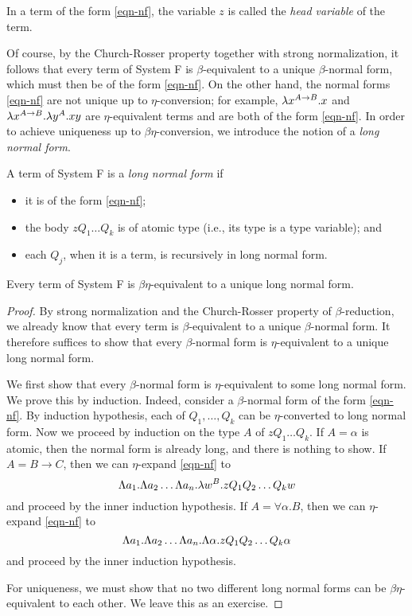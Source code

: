\documentclass{article}
\begin{document}
\begin{definition}
  In a term of the form {\eqref{eqn-nf}}, the variable $z$ is called
  the {\em head variable} of the term.
\end{definition}

Of course, by the Church-Rosser property together with strong
normalization, it follows that every term of System F is
$\beta$-equivalent to a unique $\beta$-normal form, which must then be
of the form {\eqref{eqn-nf}}. On the other hand, the normal forms
{\eqref{eqn-nf}} are not unique up to $\eta$-conversion; for example,
$\lambda x^{A\to B}.x$ and $\lambda x^{A\to B}.\lambda y^{A}.xy$ are
$\eta$-equivalent terms and are both of the form {\eqref{eqn-nf}}. 
In order to achieve uniqueness up to $\beta\eta$-conversion, we
introduce the notion of a {\em long normal form}.

\begin{definition}
  A term of System F is a {\em long normal form} if
  \begin{itemize}
  \item it is of the form {\eqref{eqn-nf}};
  \item the body $zQ_1\ldots Q_k$ is of atomic type (i.e., its type is
    a type variable); and
  \item each $Q_j$, when it is a term, is recursively in long normal form.
  \end{itemize}
\end{definition}

\begin{proposition}\label{prop-unique-lnf}
  Every term of System F is $\beta\eta$-equivalent to a unique long
  normal form.
\end{proposition}

\begin{proof}
  By strong normalization and the Church-Rosser property of
  $\beta$-reduction, we already know that every term is
  $\beta$-equivalent to a unique $\beta$-normal form. It therefore
  suffices to show that every $\beta$-normal form is $\eta$-equivalent
  to a unique long normal form.

  We first show that every $\beta$-normal form is $\eta$-equivalent to
  some long normal form. We prove this by induction. Indeed, consider
  a $\beta$-normal form of the form {\eqref{eqn-nf}}. By induction
  hypothesis, each of $Q_1,\ldots,Q_k$ can be $\eta$-converted to long
  normal form. Now we proceed by induction on the type $A$ of
  $zQ_1\ldots Q_k$. If $A=\alpha$ is atomic, then the normal form is
  already long, and there is nothing to show. If $A=B\to C$, then we
  can $\eta$-expand {\eqref{eqn-nf}} to 
  \[
  \Lambda a_1.\Lambda a_2\ldots\Lambda a_n.\lambda w^{B}.zQ_1Q_2\ldots Q_kw
  \]
  and proceed by the inner induction hypothesis. If
  $A=\forall\alpha.B$, then we can $\eta$-expand {\eqref{eqn-nf}} to
  \[
  \Lambda a_1.\Lambda a_2\ldots\Lambda a_n.\Lambda\alpha.zQ_1Q_2\ldots Q_k\alpha
  \]
  and proceed by the inner induction hypothesis.

  For uniqueness, we must show that no two different long normal forms
  can be $\beta\eta$-equivalent to each other. We leave this as an
  exercise. \eot
\end{proof}
\end{document}
